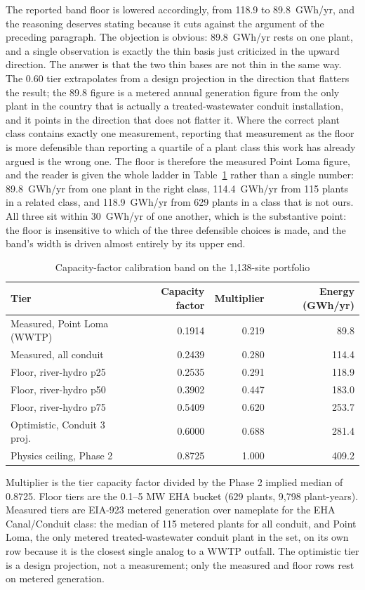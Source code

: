 \documentclass[12pt,letterpaper]{report}
\begin{document}
The reported band floor is lowered accordingly, from 118.9 to 89.8~GWh/yr, and the
reasoning deserves stating because it cuts against the argument of the preceding
paragraph. The objection is obvious: 89.8~GWh/yr rests on one plant, and a single
observation is exactly the thin basis just criticized in the upward direction. The
answer is that the two thin bases are not thin in the same way. The 0.60 tier
extrapolates from a design projection in the direction that flatters the result; the
89.8 figure is a metered annual generation figure from the only plant in the country
that is actually a treated-wastewater conduit installation, and it points in the
direction that does not flatter it. Where the correct plant class contains exactly one
measurement, reporting that measurement as the floor is more defensible than reporting
a quartile of a plant class this work has already argued is the wrong one. The floor is
therefore the measured Point Loma figure, and the reader is given the whole ladder in
Table~\ref{tab:cfband} rather than a single number: 89.8~GWh/yr from one plant in the
right class, 114.4~GWh/yr from 115 plants in a related class, and 118.9~GWh/yr from 629
plants in a class that is not ours. All three sit within 30~GWh/yr of one another, which
is the substantive point: the floor is insensitive to which of the three defensible
choices is made, and the band's width is driven almost entirely by its upper end.

\begin{table}[htbp]
\centering
\caption{Capacity-factor calibration band on the 1,138-site portfolio}
\label{tab:cfband}
\small
\begin{tabular}{@{}lrrr@{}}
\toprule
Tier & Capacity factor & Multiplier & Energy (GWh/yr) \\
\midrule
Measured, Point Loma (WWTP)  & 0.1914 & 0.219 &  89.8 \\
Measured, all conduit        & 0.2439 & 0.280 & 114.4 \\
Floor, river-hydro p25       & 0.2535 & 0.291 & 118.9 \\
Floor, river-hydro p50       & 0.3902 & 0.447 & 183.0 \\
Floor, river-hydro p75       & 0.5409 & 0.620 & 253.7 \\
Optimistic, Conduit 3 proj.  & 0.6000 & 0.688 & 281.4 \\
Physics ceiling, Phase 2     & 0.8725 & 1.000 & 409.2 \\
\bottomrule
\end{tabular}

\vspace{0.4em}
{\footnotesize Multiplier is the tier capacity factor divided by the Phase 2
implied median of 0.8725. Floor tiers are the 0.1--5 MW EHA bucket (629 plants,
9,798 plant-years). Measured tiers are EIA-923 metered generation over nameplate
for the EHA Canal/Conduit class: the median of 115 metered plants for all conduit,
and Point Loma, the only metered treated-wastewater conduit plant in the set, on its
own row because it is the closest single analog to a WWTP outfall. The optimistic
tier is a design projection, not a measurement; only the measured and floor rows
rest on metered generation.}
\end{table}
\end{document}
